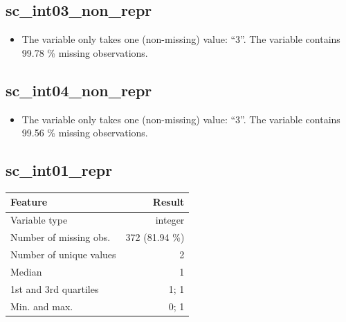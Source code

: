 \documentclass[
  letterpaper,
  DIV=11,
  numbers=noendperiod]{scrartcl}
\providecommand{\tightlist}{%
  \setlength{\itemsep}{0pt}\setlength{\parskip}{0pt}}
\begin{document}
\subsection{sc\_int03\_non\_repr}\label{sc_int03_non_repr}

\begin{itemize}
\tightlist
\item
  The variable only takes one (non-missing) value: ``3''. The variable
  contains 99.78 \% missing observations.
\end{itemize}

\fullline

\subsection{sc\_int04\_non\_repr}\label{sc_int04_non_repr}

\begin{itemize}
\tightlist
\item
  The variable only takes one (non-missing) value: ``3''. The variable
  contains 99.56 \% missing observations.
\end{itemize}

\fullline

\subsection{sc\_int01\_repr}\label{sc_int01_repr}

\bminione

\begin{longtable}[]{@{}lr@{}}
\toprule\noalign{}
Feature & Result \\
\midrule\noalign{}
\endhead
\bottomrule\noalign{}
\endlastfoot
Variable type & integer \\
Number of missing obs. & 372 (81.94 \%) \\
Number of unique values & 2 \\
Median & 1 \\
1st and 3rd quartiles & 1; 1 \\
Min. and max. & 0; 1 \\
\end{longtable}

\emini
\bminitwo
\end{document}
